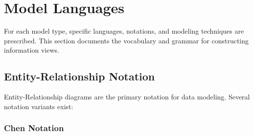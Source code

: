\documentclass[11pt,letterpaper]{article}
\begin{document}
\section{Model Languages}

For each model type, specific languages, notations, and modeling techniques are prescribed. This section documents the vocabulary and grammar for constructing information views.

\subsection{Entity-Relationship Notation}

Entity-Relationship diagrams are the primary notation for data modeling. Several notation variants exist:

\subsubsection{Chen Notation}
\end{document}
